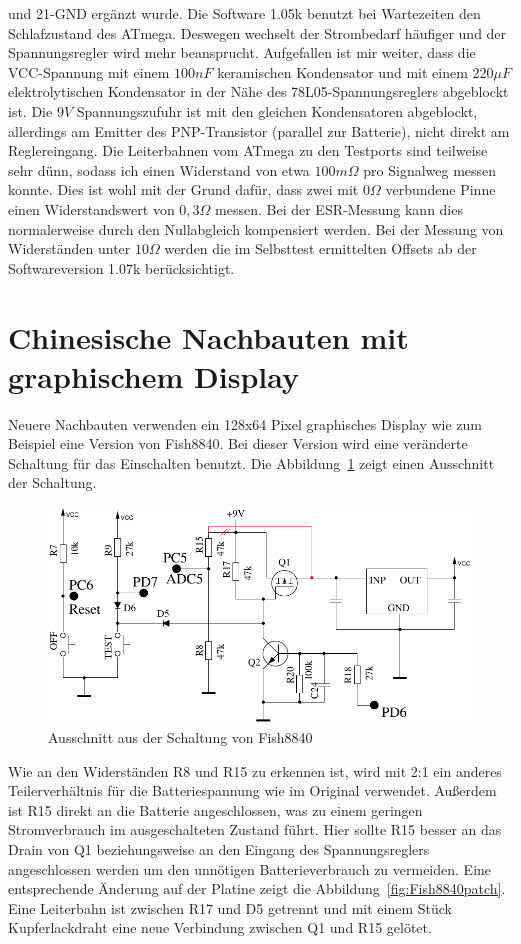 und 21-GND ergänzt wurde. Die Software 1.05k benutzt bei Wartezeiten den Schlafzustand des ATmega.
Deswegen wechselt der Strombedarf häufiger und der Spannungsregler wird mehr beansprucht.
Aufgefallen ist mir weiter, dass die VCC-Spannung mit einem \(100nF\) keramischen Kondensator und mit
einem \(220\mu F\) elektrolytischen Kondensator in der Nähe des 78L05-Spannungsreglers abgeblockt ist.
Die \(9V\) Spannungszufuhr ist mit den gleichen Kondensatoren abgeblockt, allerdings am Emitter des PNP-Transistor
(parallel zur Batterie), nicht direkt am Reglereingang.
Die Leiterbahnen vom ATmega zu den Testports sind teilweise sehr dünn, sodass ich einen Widerstand
von etwa \(100m\Omega\) pro Signalweg messen konnte. Dies ist wohl mit der Grund dafür, dass zwei
mit \(0\Omega\) verbundene Pinne einen Widerstandswert von \(0,3\Omega\) messen.
Bei der ESR-Messung kann dies normalerweise durch den Nullabgleich kompensiert werden.
Bei der Messung von Widerständen unter \(10\Omega\) werden die im Selbsttest ermittelten Offsets 
ab der Softwareversion 1.07k berücksichtigt.

\section{Chinesische Nachbauten mit graphischem Display}
Neuere Nachbauten verwenden ein 128x64 Pixel graphisches Display wie zum Beispiel eine Version von Fish8840.
Bei dieser Version wird eine veränderte Schaltung für das Einschalten benutzt. Die Abbildung~\ref{fig:Fish8840}
zeigt einen Ausschnitt der Schaltung.

\begin{figure}[H]
\centering
\includegraphics[width=.7\textwidth]{../FIG/Fish8840.pdf}	%
\caption{Ausschnitt aus der Schaltung von Fish8840}
\label{fig:Fish8840}
\end{figure}

Wie an den Widerständen R8 und R15 zu erkennen ist, 
wird mit 2:1 ein anderes Teilerverhältnis für die Batteriespannung wie im Original verwendet.
Außerdem ist R15 direkt an die Batterie angeschlossen, was zu einem geringen Stromverbrauch im
ausgeschalteten Zustand führt. Hier sollte R15 besser an das Drain von Q1 beziehungsweise an den
Eingang des Spannungsreglers angeschlossen werden um den unnötigen Batterieverbrauch zu vermeiden.
Eine entsprechende Änderung auf der Platine zeigt die Abbildung~\ref{fig:Fish8840patch}.
Eine Leiterbahn ist zwischen R17 und D5 getrennt und mit einem Stück Kupferlackdraht eine
neue Verbindung zwischen Q1 und R15 gelötet.

